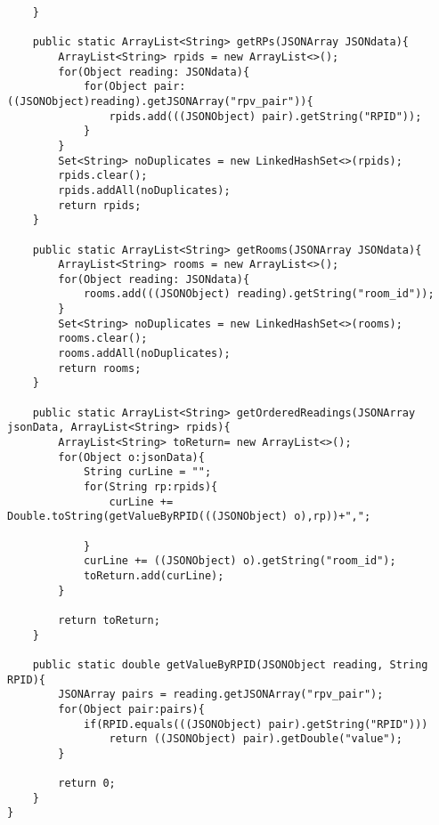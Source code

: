 \documentclass{article}
\begin{document}
\begin{lstlisting}
    }

    public static ArrayList<String> getRPs(JSONArray JSONdata){
        ArrayList<String> rpids = new ArrayList<>();
        for(Object reading: JSONdata){
            for(Object pair: ((JSONObject)reading).getJSONArray("rpv_pair")){
                rpids.add(((JSONObject) pair).getString("RPID"));
            }
        }
        Set<String> noDuplicates = new LinkedHashSet<>(rpids);
        rpids.clear();
        rpids.addAll(noDuplicates);
        return rpids;
    }

    public static ArrayList<String> getRooms(JSONArray JSONdata){
        ArrayList<String> rooms = new ArrayList<>();
        for(Object reading: JSONdata){
            rooms.add(((JSONObject) reading).getString("room_id"));
        }
        Set<String> noDuplicates = new LinkedHashSet<>(rooms);
        rooms.clear();
        rooms.addAll(noDuplicates);
        return rooms;
    }

    public static ArrayList<String> getOrderedReadings(JSONArray jsonData, ArrayList<String> rpids){
        ArrayList<String> toReturn= new ArrayList<>();
        for(Object o:jsonData){
            String curLine = "";
            for(String rp:rpids){
                curLine += Double.toString(getValueByRPID(((JSONObject) o),rp))+",";

            }
            curLine += ((JSONObject) o).getString("room_id");
            toReturn.add(curLine);
        }

        return toReturn;
    }

    public static double getValueByRPID(JSONObject reading, String RPID){
        JSONArray pairs = reading.getJSONArray("rpv_pair");
        for(Object pair:pairs){
            if(RPID.equals(((JSONObject) pair).getString("RPID")))
                return ((JSONObject) pair).getDouble("value");
        }

        return 0;
    }
}
\end{lstlisting}
\end{document}
